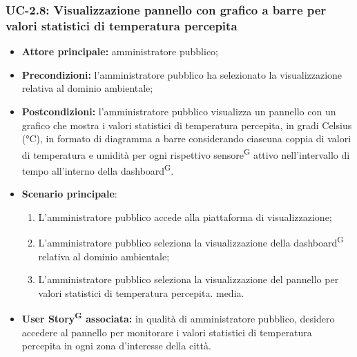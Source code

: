 \documentclass[8pt]{article}
\newcommand{\glossterm}[1]{#1\textsuperscript{G}} %
\begin{document}
\subsubsection*{UC-2.8: Visualizzazione pannello con grafico a barre per valori statistici di temperatura percepita}
\begin{itemize}
    \item \textbf{Attore principale:} amministratore pubblico;
    \item \textbf{Precondizioni: }l'amministratore pubblico ha selezionato la visualizzazione
        relativa al dominio ambientale;
    \item \textbf{Postcondizioni:} l'amministratore pubblico visualizza un pannello con un grafico che mostra i valori statistici di temperatura percepita, in gradi Celsius (°C), in formato di diagramma a barre considerando ciascuna coppia di valori di temperatura e umidità per ogni rispettivo \glossterm{sensore} attivo nell'intervallo di tempo all'interno della \glossterm{dashboard}.
    \item \textbf{Scenario principale}:
    \begin{enumerate}
    \item L'amministratore pubblico accede alla piattaforma di visualizzazione;
    \item L'amministratore pubblico seleziona la visualizzazione della \glossterm{dashboard} relativa al dominio
        ambientale; 
    \item L'amministratore pubblico seleziona la visualizzazione del pannello per valori statistici di temperatura percepita.
        media.
    \end{enumerate}
\item \textbf{\glossterm{User Story} associata:} in qualità di amministratore pubblico, desidero accedere al pannello per monitorare i valori statistici di temperatura percepita in ogni zona d'interesse della città.
\end{itemize}
\end{document}
